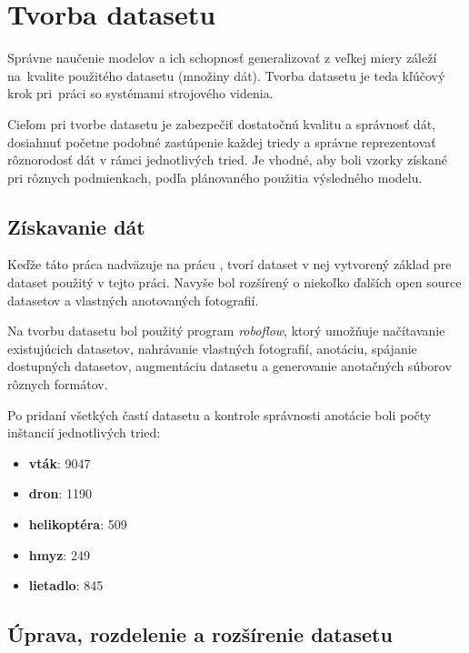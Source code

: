 \chapter{Tvorba datasetu}

    Správne naučenie modelov a ich schopnosť generalizovať z veľkej miery záleží na~kvalite použitého datasetu (množiny dát). Tvorba datasetu je teda kľúčový krok pri~práci so systémami strojového videnia.

    Cieľom pri tvorbe datasetu je zabezpečiť dostatočnú kvalitu a správnosť dát, dosiahnuť početne podobné zastúpenie každej triedy a správne reprezentovať rôznorodosť dát v rámci jednotlivých tried. Je vhodné, aby boli vzorky získané pri rôznych podmienkach, podľa plánovaného použitia výsledného modelu.

    \section{Získavanie dát}

        Keďže táto práca nadväzuje na prácu \cite{Jurecka2021}, tvorí dataset v nej vytvorený základ pre dataset použitý v tejto práci. Navyše bol rozšírený o niekoľko ďalších open source datasetov a vlastných anotovaných fotografií.

        Na tvorbu datasetu bol použitý program \emph{roboflow}, ktorý umožňuje načítavanie existujúcich datasetov, nahrávanie vlastných fotografií, anotáciu, spájanie dostupných datasetov, augmentáciu datasetu a generovanie anotačných súborov rôznych formátov.

        Po pridaní všetkých častí datasetu a kontrole správnosti anotácie boli počty inštancií jednotlivých tried:

        \begin{itemize}
            \item \textbf{vták}: 9047
            \item \textbf{dron}: 1190
            \item \textbf{helikoptéra}: 509
            \item \textbf{hmyz}: 249
            \item \textbf{lietadlo}: 845
        \end{itemize}

    \section{Úprava, rozdelenie a rozšírenie datasetu}

